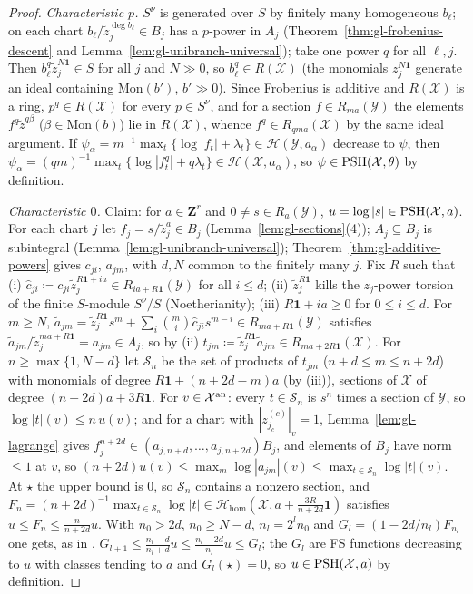 \begin{proof}
\emph{Characteristic $p$.} $S^\nu$ is generated over $S$ by finitely many homogeneous $b_\ell$; on each chart $b_\ell/\tilde z_j^{\deg b_\ell}\in B_j$ has a $p$-power in $A_j$
(Theorem~\ref{thm:gl-frobenius-descent} and Lemma~\ref{lem:gl-unibranch-universal}); take one power $q$ for all $\ell,j$. Then $b_\ell^q\tilde z_j^{N\mathbf1}\in S$ for all $j$ and
$N\gg0$, so $b_\ell^q\in R(\mathcal X)$ (the monomials $z_j^{N\mathbf1}$ generate an ideal containing $\mathrm{Mon}(b')$, $b'\gg0$). Since Frobenius is additive and
$R(\mathcal X)$ is a ring, $p^q\in R(\mathcal X)$ for every $p\in S^\nu$, and for a section $f\in R_{ma}(\mathcal Y)$ the elements $f^q\tilde z^{q\beta}$ ($\beta\in\mathrm{Mon}(b)$) lie
in $R(\mathcal X)$, whence $f^q\in R_{qma}(\mathcal X)$ by the same ideal argument. If $\psi_\alpha=m^{-1}\max_t\{\log|f_t|+\lambda_t\}\in\mathcal H(\mathcal Y,a_\alpha)$
decrease to $\psi$, then $\psi_\alpha=(qm)^{-1}\max_t\{\log|f_t^q|+q\lambda_t\}\in\mathcal H(\mathcal X,a_\alpha)$, so $\psi\in\operatorname{PSH}(\mathcal X,\theta)$ by definition.

\emph{Characteristic $0$.} Claim: for $a\in\mathbf Z^r$ and $0\ne s\in R_a(\mathcal Y)$, $u=\log|s|\in\operatorname{PSH}(\mathcal X,a)$. For each chart $j$ let $f_j=s/\tilde z_j^a\in B_j$
(Lemma~\ref{lem:gl-sections}(4)); $A_j\subseteq B_j$ is subintegral (Lemma~\ref{lem:gl-unibranch-universal}); Theorem~\ref{thm:gl-additive-powers} gives $c_{ji}$, $a_{jm}$,
with $d,N$ common to the finitely many $j$. Fix $R$ such that (i) $\hat c_{ji}\coloneqq c_{ji}\tilde z_j^{R\mathbf1+ia}\in R_{ia+R\mathbf1}(\mathcal Y)$ for all $i\le d$; (ii) $\tilde
z_j^{R\mathbf1}$ kills the $z_j$-power torsion of the finite $S$-module $S^\nu/S$ (Noetherianity); (iii) $R\mathbf1+ia\ge0$ for $0\le i\le d$. For $m\ge N$,
$\tilde a_{jm}=\tilde z_j^{R\mathbf1}s^m+\sum_i\binom mi\hat c_{ji}s^{m-i}\in R_{ma+R\mathbf1}(\mathcal Y)$ satisfies $\tilde a_{jm}/\tilde z_j^{ma+R\mathbf1}=a_{jm}\in A_j$,
so by (ii) $t_{jm}\coloneqq\tilde z_j^{R\mathbf1}\tilde a_{jm}\in R_{ma+2R\mathbf1}(\mathcal X)$. For $n\ge\max\{1,N-d\}$ let $\mathcal S_n$ be the set of products of
$t_{jm}$ ($n+d\le m\le n+2d$) with monomials of degree $R\mathbf1+(n+2d-m)a$ (by (iii)), sections of $\mathcal X$ of degree $(n+2d)a+3R\mathbf1$. For $v\in\mathcal X^{\mathrm{an}}$:
every $t\in\mathcal S_n$ is $s^n$ times a section of $\mathcal Y$, so $\log|t|(v)\le n\,u(v)$; and for a chart with $|z^{(c)}_{j_c}|_v=1$,
Lemma~\ref{lem:gl-lagrange} gives $f_j^{n+2d}\in(a_{j,n+d},\dots,a_{j,n+2d})B_j$, and elements of $B_j$ have norm $\le1$ at $v$, so
$(n+2d)u(v)\le\max_m\log|a_{jm}|(v)\le\max_{t\in\mathcal S_n}\log|t|(v)$. At $\star$ the upper bound is $0$, so $\mathcal S_n$ contains a nonzero section, and
$F_n=(n+2d)^{-1}\max_{t\in\mathcal S_n}\log|t|\in\mathcal H_{\mathrm{hom}}(\mathcal X,a+\tfrac{3R}{n+2d}\mathbf 1)$ satisfies $u\le F_n\le\tfrac n{n+2d}u$. With $n_0>2d$,
$n_0\ge N-d$, $n_l=2^ln_0$ and $G_l=(1-2d/n_l)F_{n_l}$ one gets, as in \cite{FHX}, $G_{l+1}\le\tfrac{n_l-d}{n_l+d}u\le\tfrac{n_l-2d}{n_l}u\le G_l$; the $G_l$ are FS functions
decreasing to $u$ with classes tending to $a$ and $G_l(\star)=0$, so $u\in\operatorname{PSH}(\mathcal X,a)$ by definition.


\end{proof}
